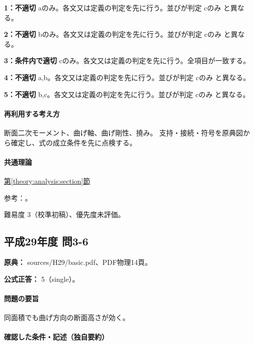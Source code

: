 \noindent\textbf{1：不適切} aのみ。各文又は定義の判定を先に行う。並びが判定 cのみ と異なる。\par

\noindent\textbf{2：不適切} bのみ。各文又は定義の判定を先に行う。並びが判定 cのみ と異なる。\par

\noindent\textbf{3：条件内で適切} cのみ。各文又は定義の判定を先に行う。全項目が一致する。\par

\noindent\textbf{4：不適切} a,b。各文又は定義の判定を先に行う。並びが判定 cのみ と異なる。\par

\noindent\textbf{5：不適切} b,c。各文又は定義の判定を先に行う。並びが判定 cのみ と異なる。\par

\paragraph{再利用する考え方} 断面二次モーメント、曲げ軸、曲げ剛性、撓み。 支持・接続・符号を原典図から確定し、式の成立条件を先に点検する。

\paragraph{共通理論} \hyperref[theory:analysis:section]{第\ref*{theory:analysis:section}節}

\par 参考：\cite{struct_mit_beam}。

\par 難易度 3（校準初稿）、優先度未評価。

\subsection{平成29年度 問3-6}
\label{q:h29-reg-basic-3-6}

\noindent\textbf{原典：} sources/H29/basic.pdf、PDF物理14頁。

\textbf{公式正答：} 5（single）。

\paragraph{問題の要旨} 同面積でも曲げ方向の断面高さが効く。

\paragraph{確認した条件・記述（独自要約）}\mbox{}\par

